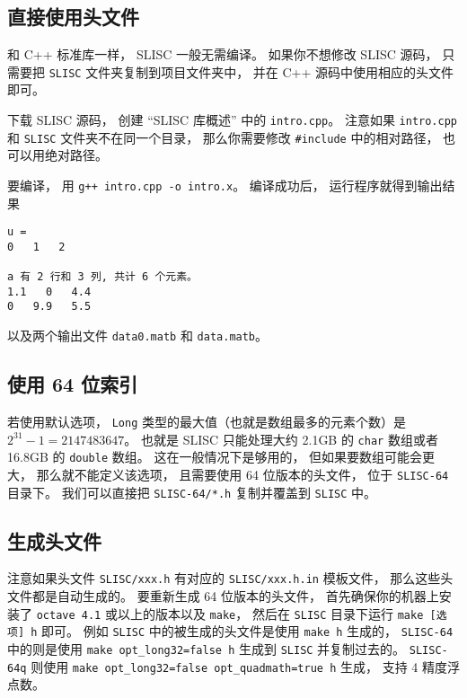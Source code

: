 
\begin{issues}
\issueDraft
\end{issues}


\subsection{直接使用头文件}
和 C++ 标准库一样， SLISC 一般无需编译。 如果你不想修改 SLISC 源码， 只需要把 \verb|SLISC| 文件夹复制到项目文件夹中， 并在 C++ 源码中使用相应的头文件即可。

下载 SLISC 源码， 创建 “SLISC 库概述” 中的 \verb|intro.cpp|。 注意如果 \verb|intro.cpp| 和 \verb|SLISC| 文件夹不在同一个目录， 那么你需要修改 \verb|#include| 中的相对路径， 也可以用绝对路径。

要编译， 用 \verb|g++ intro.cpp -o intro.x|。 编译成功后， 运行程序就得到输出结果
\begin{lstlisting}[language=none]
u = 
0   1   2   

a 有 2 行和 3 列, 共计 6 个元素。
1.1   0   4.4   
0   9.9   5.5
\end{lstlisting}
以及两个输出文件 \verb|data0.matb| 和 \verb|data.matb|。

\subsection{使用 64 位索引}
若使用默认选项， \verb|Long| 类型的最大值（也就是数组最多的元素个数）是 $2^{31}-1 = 2147483647$。 也就是 SLISC 只能处理大约 2.1GB 的 \verb|char| 数组或者 16.8GB 的 \verb|double| 数组。 这在一般情况下是够用的， 但如果要数组可能会更大， 那么就不能定义该选项， 且需要使用 64 位版本的头文件， 位于 \verb|SLISC-64| 目录下。 我们可以直接把 \verb|SLISC-64/*.h| 复制并覆盖到 \verb|SLISC| 中。

\subsection{生成头文件}

注意如果头文件 \verb|SLISC/xxx.h| 有对应的 \verb|SLISC/xxx.h.in| 模板文件， 那么这些头文件都是自动生成的。 要重新生成 64 位版本的头文件， 首先确保你的机器上安装了 \verb|octave 4.1| 或以上的版本以及 \verb|make|， 然后在 \verb|SLISC| 目录下运行 \verb|make [选项] h| 即可。 例如 \verb|SLISC| 中的被生成的头文件是使用 \verb|make h| 生成的， \verb|SLISC-64| 中的则是使用 \verb|make opt_long32=false h| 生成到 \verb|SLISC| 并复制过去的。 \verb|SLISC-64q| 则使用 \verb|make opt_long32=false opt_quadmath=true h| 生成， 支持 4 精度浮点数。

